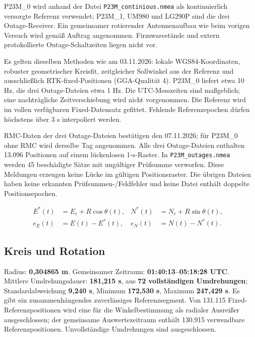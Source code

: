 \documentclass[11pt,a4paper]{article}
\numberwithin{equation}{section}
\numberwithin{figure}{section}
\begin{document}
P23M\_0 wird anhand der Datei {\small\texttt{P23M\_\allowbreak{}continious.nmea}} als kontinuierlich versorgte Referenz verwendet; P23M\_1, UM980 und LG290P sind die drei Outage-Receiver. Ein gemeinsamer rotierender Antennenaufbau wie beim vorigen Versuch wird gemäß Auftrag angenommen. Firmwarestände und extern protokollierte Outage-Schaltzeiten liegen nicht vor.

Es gelten dieselben Methoden wie am 03.11.2026: lokale WGS84-Koordinaten, robuster geometrischer Kreisfit, zeitgleicher Sollwinkel aus der Referenz und ausschließlich RTK-fixed-Positionen (GGA-Qualität 4). P23M\_0 liefert etwa 10 Hz, die drei Outage-Dateien etwa 1 Hz. Die UTC-Messzeiten sind maßgeblich; eine nachträgliche Zeitverschiebung wird nicht vorgenommen. Die Referenz wird im vollen verfügbaren Fixed-Datensatz gefittet. Fehlende Referenzepochen dürfen höchstens über 3 s interpoliert werden.

RMC-Daten der drei Outage-Dateien bestätigen den 07.11.2026; für P23M\_0 ohne RMC wird derselbe Tag angenommen. Alle drei Outage-Dateien enthalten 13.096 Positionen auf einem lückenlosen 1-s-Raster. In {\small\texttt{P23M\_\allowbreak{}outages.nmea}} werden 45 beschädigte Sätze mit ungültiger Prüfsumme verworfen. Diese Meldungen erzeugen keine Lücke im gültigen Positionsraster. Die übrigen Dateien haben keine erkannten Prüfsummen-/\allowbreak{}Feldfehler und keine Datei enthält doppelte Positionsepochen.

\begin{equation}\begin{aligned} E^*(t)&=E_c+R\cos\theta(t), & N^*(t)&=N_c+R\sin\theta(t),\\ e_E(t)&=E(t)-E^*(t), & e_N(t)&=N(t)-N^*(t).\end{aligned}\label{eq:de-circle}\end{equation}

\subsection{Kreis und Rotation}

Radius: \textbf{0,304865 m}. Gemeinsamer Zeitraum: \textbf{01:40:13–05:18:28 UTC}. Mittlere Umdrehungsdauer: \textbf{181,215 s}, aus \textbf{72 vollständigen Umdrehungen}; Standardabweichung \textbf{9,240 s}, Minimum \textbf{172,530 s}, Maximum \textbf{247,429 s}. Es gibt ein zusammenhängendes zuverlässiges Referenzsegment. Von 131.115 Fixed-Referenzpositionen wird eine für die Winkelbestimmung als radialer Ausreißer ausgeschlossen; der gemeinsame Auswertezeitraum enthält 130.915 verwendbare Referenzpositionen. Unvollständige Umdrehungen sind ausgeschlossen.
\end{document}
